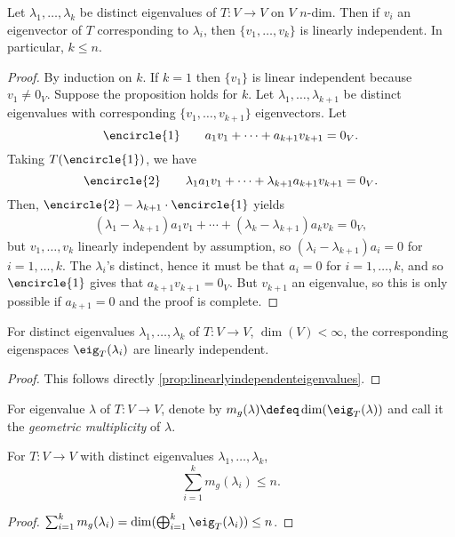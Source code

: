 \begin{proposition}\label{prop:linearlyindependenteigenvalues}
    Let $\lambda_1, \dots, \lambda_k$ be distinct eigenvalues of $T : V \to V$ on $V$ $n$-dim. Then if $v_i$ an eigenvector of $T$ corresponding to $\lambda_i$, then $\{v_1, \dots, v_k\}$ is linearly independent. In particular, $k \leq n$.
\end{proposition}
\begin{proof}
    By induction on $k$. If $k = 1$ then $\{v_1\}$ is linear independent because $v_1 \neq 0_V$. Suppose the proposition holds for $k$. Let $\lambda_1, \dots, \lambda_{k+1}$ be distinct eigenvalues with corresponding $\{v_1, \dots, v_{k+1}\}$ eigenvectors. Let $$\encircle{1} \qquad a_1 v_1 + \cdots + a_{k+1} v_{k+1} = 0_V.$$
    Taking $T(\encircle{1})$, we have \[
    \encircle{2} \qquad \lambda_1 a_1 v_1 +    \cdots + \lambda_{k+1} a_{k+1} v_{k+1} = 0_V.
    \]
    Then, $\encircle{2} - \lambda_{k+1} \cdot \encircle{1}$ yields \begin{align*}
        (\lambda_1 - \lambda_{k+1})a_1v_1 + \cdots + (\lambda_k - \lambda_{k+1})a_kv_k = 0_V,
    \end{align*}
    but $v_1, \dots, v_k$ linearly independent by assumption, so $(\lambda_i - \lambda_{k+1})a_i = 0$ for $i = 1, \dots, k$. The $\lambda_i$'s distinct, hence it must be that $a_i = 0$ for $i = 1, \dots, k$, and so $\encircle{1}$ gives that $a_{k+1} v_{k+1} = 0_V$. But $v_{k+1}$ an eigenvalue, so this is only possible if $a_{k+1} = 0$ and the proof is complete.
\end{proof}

\begin{corollary}
    For distinct eigenvalues $\lambda_1, \dots, \lambda_k$ of $T : V \to V$, $\dim(V) < \infty$, the corresponding eigenspaces $\eig_{T}(\lambda_i)$ are linearly independent.
\end{corollary}

\begin{proof}
    This follows directly \cref{prop:linearlyindependenteigenvalues}.
\end{proof}

\begin{definition}
    For eigenvalue $\lambda$ of $T : V \to V$, denote by $m_g(\lambda) \defeq \dim(\eig_{T}(\lambda))$ and call it the \emph{geometric multiplicity} of $\lambda$.
\end{definition}

\begin{corollary}
    For $T : V \to V$ with distinct eigenvalues $\lambda_1, \dots, \lambda_k$, \[
    \sum_{i=1}^k m_g(\lambda_i)     \leq n.
    \]
\end{corollary}

\begin{proof}
    $\sum_{i=1}^k m_g(\lambda_i) = \dim(\bigoplus_{i=1}^k \eig_{T}(\lambda_i)) \leq n$.
\end{proof}